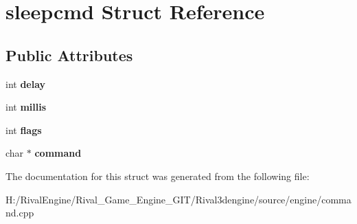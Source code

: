 \hypertarget{structsleepcmd}{}\section{sleepcmd Struct Reference}
\label{structsleepcmd}
\subsection*{Public Attributes}
\begin{DoxyCompactItemize}
\item 
\mbox{\label{structsleepcmd_a9c8a232e1ce62161e933da3847f4a79a}} 
int {\bfseries delay}
\item 
\mbox{\label{structsleepcmd_a15483e65ad186842b5b61ce23bd6ebaf}} 
int {\bfseries millis}
\item 
\mbox{\label{structsleepcmd_a685dca17deedc930851f62066a985a3c}} 
int {\bfseries flags}
\item 
\mbox{\label{structsleepcmd_a6b13825dfb64ef313cb78801a7880fd4}} 
char $\ast$ {\bfseries command}
\end{DoxyCompactItemize}


The documentation for this struct was generated from the following file\+:\begin{DoxyCompactItemize}
\item 
H\+:/\+Rival\+Engine/\+Rival\+\_\+\+Game\+\_\+\+Engine\+\_\+\+G\+I\+T/\+Rival3dengine/source/engine/command.\+cpp\end{DoxyCompactItemize}
